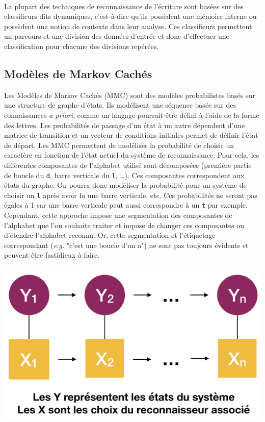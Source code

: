 \paragraph{}
La plupart des techniques de reconnaissance de l'écriture sont basées sur des classifieurs
dits dynamiques, c'est-à-dire qu'ils possèdent une mémoire interne ou possèdent une notion
de contexte dans leur analyse. Ces classifieurs permettent un parcours et une division des
données d'entrée et donc d'effectuer une classification pour chacune des divisions repérées. 
		
\subsection{Modèles de Markov Cachés}

Les Modèles de Markov Cachés (MMC) sont des modèles probabilistes basés sur une structure de
graphe d'états. Ils modélisent une séquence basée sur des connaissances \textit{a priori},
comme un langage pourrait être défini à l'aide de la forme des lettres. Les probabilités de passage
d'un état à un autre dépendent d'une matrice de transition et un vecteur de conditions initiales
permet de définir l'état de départ. Les MMC permettent de modéliser la probabilité de choisir un caractère
en fonction de l'état actuel du système de reconnaissance. Pour cela, les différentes composantes
de l'alphabet utilisé sont décomposées (première partie de boucle du \texttt{d}, barre verticale du \texttt{l}, \ldots).
Ces composantes correspondent aux états du graphe. On pourra donc modéliser la
probabilité pour un système de choisir un \texttt{l} après avoir lu une barre verticale, etc.
Ces probabilités ne seront pas égales à 1 car une barre verticale peut aussi correspondre à un
\texttt{t} par exemple. Cependant, cette approche impose une segmentation des composantes
de l'alphabet que l'on souhaite traiter et impose de changer ces composantes ou d'étendre
l'alphabet reconnu. Or, cette segmentation et l'étiquetage correspondant (\textit{e.g.} "c'est une boucle d'un a")
ne sont pas toujours évidents et peuvent être fastidieux à faire.

\newpage

\paragraph{}
\begin{mdframed}[frametitle={Figure 8 : Schéma de transition et d'observation d'un MMC}, innerbottommargin=10]
\begin{center}
\includegraphics[width=0.6\linewidth]{mmc.png}
\end{center}
\end{mdframed}

